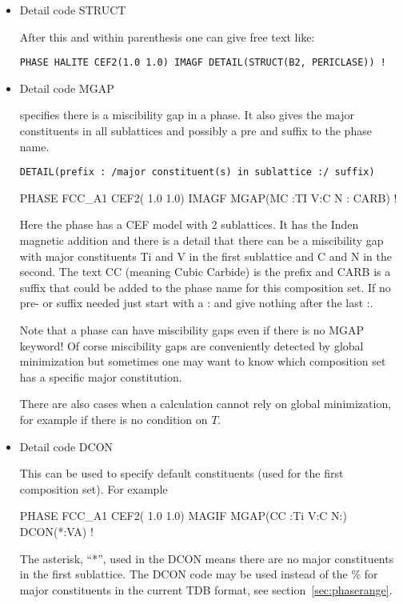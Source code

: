 \documentclass[12pt]{article}
\begin{document}
\begin{itemize}
\item Detail code STRUCT

After this and within parenthesis one can give free text like:
\begin{verbatim}
PHASE HALITE CEF2(1.0 1.0) IMAGF DETAIL(STRUCT(B2, PERICLASE)) !
\end{verbatim}


\item Detail code MGAP 

  specifies there is a miscibility gap in a phase.  It also gives the
  major constituents in all sublattices and possibly a pre and suffix
  to the phase name.
\begin{verbatim}
DETAIL(prefix : /major constituent(s) in sublattice :/ suffix)
\end{verbatim}

  PHASE FCC\_A1 CEF2( 1.0 1.0) IMAGF MGAP(MC :TI V:C N : CARB) !

  Here the phase has a CEF model with 2 sublattices.  It has the Inden
  magnetic addition and there is a detail that there can be a
  miscibility gap with major constituents Ti and V in the first
  sublattice and C and N in the second.  The text CC (meaning Cubic
  Carbide) is the prefix and CARB is a suffix that could be added to
  the phase name for this composition set.  If no pre- or suffix
  needed just start with a : and give nothing after the last :.

  Note that a phase can have miscibility gaps even if there is no MGAP
  keyword!  Of corse miscibility gaps are conveniently detected by
  global minimization but sometimes one may want to know which
  composition set has a specific major constitution.

  There are also cases when a calculation cannot rely on global
  minimization, for example if there is no condition on $T$.

\item Detail code DCON

  This can be used to specify default constituents (used for the first
  composition set).  For example

  PHASE FCC\_A1 CEF2( 1.0 1.0) MAGIF MGAP(CC :Ti V:C N:) DCON(*:VA) !

  The asterisk, ``*'', used in the DCON means there are no major
  constituents in the first sublattice.  The DCON code may be used
  instead of the \% for major constituents in the current TDB format,
  see section~\ref{sec:phaserange}.

\end{itemize}
\end{document}

